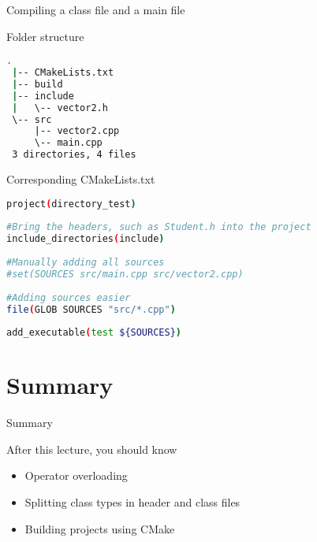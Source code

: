 \documentclass[12pt,t]{beamer}
\begin{document}
\begin{frame}[fragile]{Compiling a class file and a main file}

\begin{block}{Folder structure}
\begin{lstlisting}[language=bash]
 .
 |-- CMakeLists.txt
 |-- build
 |-- include
 |   \-- vector2.h
 \-- src
     |-- vector2.cpp
     \-- main.cpp
 3 directories, 4 files
\end{lstlisting}
\end{block}

\end{frame}


\begin{frame}[fragile]{Corresponding CMakeLists.txt}
\begin{lstlisting}[language=bash]
project(directory_test)
 
#Bring the headers, such as Student.h into the project
include_directories(include)
 
#Manually adding all sources 
#set(SOURCES src/main.cpp src/vector2.cpp)
 
#Adding sources easier
file(GLOB SOURCES "src/*.cpp")
 
add_executable(test ${SOURCES})
\end{lstlisting}
\end{frame}

\section{Summary}

\begin{frame}{Summary}
\begin{block}{After this lecture, you should know}
\begin{itemize}
\item Operator overloading
\item Splitting class types in header and class files
\item Building projects using CMake
\end{itemize}
\end{block}
\end{frame}
\end{document}
